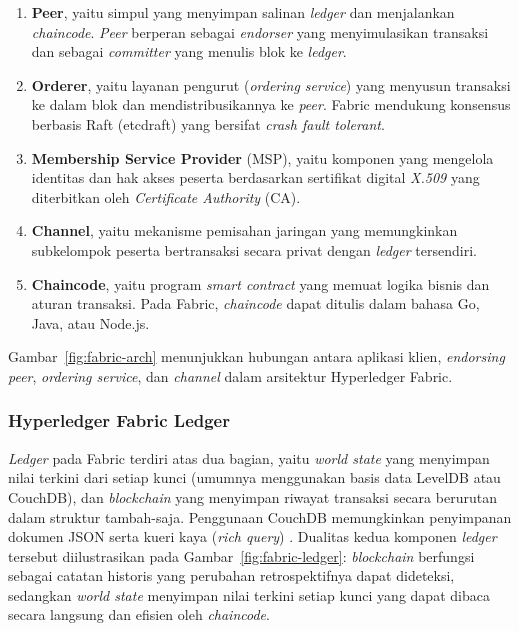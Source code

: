 \begin{enumerate}
    \item \textbf{Peer}, yaitu simpul yang menyimpan salinan \textit{ledger} dan
    menjalankan \textit{chaincode}. \textit{Peer} berperan sebagai
    \textit{endorser} yang menyimulasikan transaksi dan sebagai
    \textit{committer} yang menulis blok ke \textit{ledger}.
    \item \textbf{Orderer}, yaitu layanan pengurut (\textit{ordering service})
    yang menyusun transaksi ke dalam blok dan mendistribusikannya ke
    \textit{peer}. Fabric mendukung konsensus berbasis Raft (etcdraft) yang
    bersifat \textit{crash fault tolerant}.
    \item \textbf{Membership Service Provider} (MSP), yaitu komponen yang
    mengelola identitas dan hak akses peserta berdasarkan sertifikat digital
    \textit{X.509} yang diterbitkan oleh \textit{Certificate Authority} (CA).
    \item \textbf{Channel}, yaitu mekanisme pemisahan jaringan yang memungkinkan
    subkelompok peserta bertransaksi secara privat dengan \textit{ledger}
    tersendiri.
    \item \textbf{Chaincode}, yaitu program \textit{smart contract} yang memuat
    logika bisnis dan aturan transaksi. Pada Fabric, \textit{chaincode} dapat
    ditulis dalam bahasa Go, Java, atau Node.js.
\end{enumerate}

Gambar~\ref{fig:fabric-arch} menunjukkan hubungan antara aplikasi klien,
\textit{endorsing peer}, \textit{ordering service}, dan \textit{channel}
dalam arsitektur Hyperledger Fabric.



\subsubsection{Hyperledger Fabric Ledger}

\textit{Ledger} pada Fabric terdiri atas dua bagian, yaitu \textit{world state}
yang menyimpan nilai terkini dari setiap kunci (umumnya menggunakan basis data
LevelDB atau CouchDB), dan \textit{blockchain} yang menyimpan riwayat transaksi
secara berurutan dalam struktur tambah-saja. Penggunaan CouchDB memungkinkan
penyimpanan dokumen JSON serta kueri kaya (\textit{rich query})
\cite{unknown2025p}. Dualitas kedua komponen \textit{ledger} tersebut
diilustrasikan pada Gambar~\ref{fig:fabric-ledger}: \textit{blockchain}
berfungsi sebagai catatan historis yang perubahan retrospektifnya dapat
dideteksi, sedangkan
\textit{world state} menyimpan nilai terkini setiap kunci yang dapat dibaca
secara langsung dan efisien oleh \textit{chaincode}.

